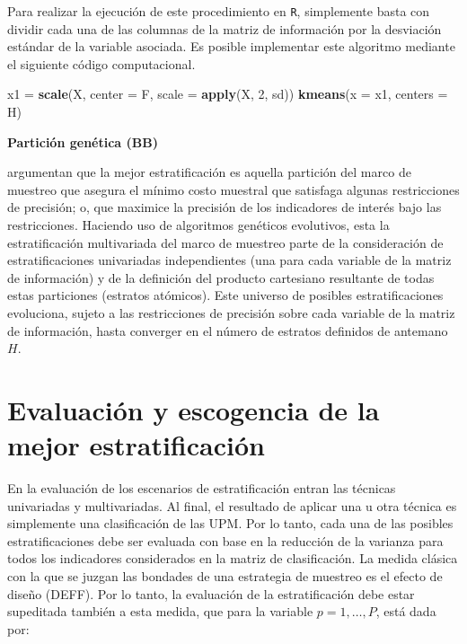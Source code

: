 \documentclass[12pt,spanish,]{book}
\newenvironment{Shaded}{\begin{snugshade}}{\end{snugshade}}
\newcommand{\DataTypeTok}[1]{\textcolor[rgb]{0.13,0.29,0.53}{#1}}
\newcommand{\DecValTok}[1]{\textcolor[rgb]{0.00,0.00,0.81}{#1}}
\newcommand{\KeywordTok}[1]{\textcolor[rgb]{0.13,0.29,0.53}{\textbf{#1}}}
\newcommand{\NormalTok}[1]{#1}
\newcommand{\StringTok}[1]{\textcolor[rgb]{0.31,0.60,0.02}{#1}}
\begin{document}
Para realizar la ejecución de este procedimiento en \texttt{R}, simplemente basta con dividir cada una de las columnas de la matriz de información por la desviación estándar de la variable asociada. Es posible implementar este algoritmo mediante el siguiente código computacional.

\begin{Shaded}
\begin{Highlighting}[]
\NormalTok{x1 =}\StringTok{ }\KeywordTok{scale}\NormalTok{(X, }\DataTypeTok{center =}\NormalTok{ F, }\DataTypeTok{scale =} \KeywordTok{apply}\NormalTok{(X, }\DecValTok{2}\NormalTok{, sd))}
\KeywordTok{kmeans}\NormalTok{(}\DataTypeTok{x =}\NormalTok{ x1, }\DataTypeTok{centers =}\NormalTok{ H)}
\end{Highlighting}
\end{Shaded}

\textbf{Partición genética (BB)}

\textcite{Ballin_Barcaroli_2013} argumentan que la mejor estratificación es aquella partición del marco de muestreo que asegura el mínimo costo muestral que satisfaga algunas restricciones de precisión; o, que maximice la precisión de los indicadores de interés bajo las restricciones. Haciendo uso de algoritmos genéticos evolutivos, esta la estratificación multivariada del marco de muestreo parte de la consideración de estratificaciones univariadas independientes (una para cada variable de la matriz de información) y de la definición del producto cartesiano resultante de todas estas particiones (estratos atómicos). Este universo de posibles estratificaciones evoluciona, sujeto a las restricciones de precisión sobre cada variable de la matriz de información, hasta converger en el número de estratos definidos de antemano \(H\).

\hypertarget{evaluacion-y-escogencia-de-la-mejor-estratificacion}{%
\section{Evaluación y escogencia de la mejor estratificación}\label{evaluacion-y-escogencia-de-la-mejor-estratificacion}}

En la evaluación de los escenarios de estratificación entran las técnicas univariadas y multivariadas. Al final, el resultado de aplicar una u otra técnica es simplemente una clasificación de las UPM. Por lo tanto, cada una de las posibles estratificaciones debe ser evaluada con base en la reducción de la varianza para todos los indicadores considerados en la matriz de clasificación. La medida clásica con la que se juzgan las bondades de una estrategia de muestreo es el efecto de diseño (DEFF). Por lo tanto, la evaluación de la estratificación debe estar supeditada también a esta medida, que para la variable \(p = 1, \ldots, P\), está dada por:
\end{document}
